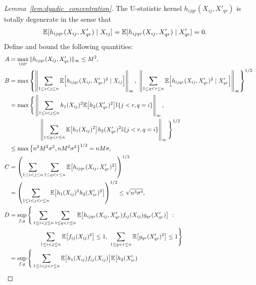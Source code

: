 \begin{proof}[Lemma~\ref{lem:dyadic_concentration}]
  The U-statistic kernel $h_{ijqr}(X_{ij}, X'_{qr})$
  is totally degenerate in the sense that
  \begin{align*}
    \mathbb{E}[h_{ijqr}(X_{ij}, X'_{qr}) \mid X_{ij}]
    &=
    \mathbb{E}[h_{ijqr}(X_{ij}, X'_{qr}) \mid X'_{qr}]
    = 0.
  \end{align*}
  Define and bound the following quantities:
  \begingroup
  \allowdisplaybreaks
  \begin{align*}
    A
    &=
    \max_{ijqr}
    \|h_{ijqr}(X_{ij}, X'_{qr})\|_\infty
    \leq M^2, \\
    B
    &=
    \max
    \left\{
    \left\|
    \sum_{1 \leq i < j \leq n}
    \E\Big[
    h_{ijqr}(X_{ij}, X'_{qr})^2
    \mid X_{ij}
    \Big]
    \right\|_\infty, \
    \left\|
    \sum_{1 \leq q < r \leq n}
    \E\Big[
    h_{ijqr}(X_{ij}, X'_{qr})^2
    \mid X'_{qr}
    \Big]
    \right\|_\infty
    \right\}^{1/2} \\
    &=
    \max
    \Bigg\{
    \left\|
    \sum_{1 \leq i < j \leq n}
    h_1(X_{ij})^2
    \E\big[
      h_2(X_{qr}')^2
      \big]
    \I\{j<r, q=i\}
    \right\|_\infty, \\
    &\qquad\qquad\quad
    \left\|
    \sum_{1 \leq q < r \leq n}
    \E\big[
      h_1(X_{ij})^2
      \big]
    h_2(X_{qr}')^2
    \I\{j<r, q=i\}
    \right\|_\infty
    \Bigg\}^{1/2} \\
    &\leq
    \max
    \left\{
    n^2 M^2 \sigma^2,
    n M^2 \sigma^2
    \right\}^{1/2}
    =
    n M \sigma, \\
    C
    &=
    \left(
      \sum_{1 \leq i < j \leq n}
      \sum_{1 \leq q < r \leq n}
      \E\big[
      h_{ijqr}(X_{ij}, X'_{qr})^2
      \big]
    \right)^{1/2} \\
    &=
    \left(
      \sum_{1 \leq i < j < r \leq n}
      \E\big[
        h_1(X_{ij})^2
        h_2(X_{ir}')^2
        \big]
    \right)^{1/2}
    \leq
    \sqrt{n^3 \sigma^4}, \\
    D
    &=
    \sup_{f,g} \Bigg\{
    \sum_{1 \leq i < j \leq n}
    \sum_{1 \leq q < r \leq n}
    \E\big[
    h_{ijqr}(X_{ij}, X'_{qr})
    f_{ij}(X_{ij})
    g_{qr}(X'_{qr})
    \big]
    \ : \\
    &\qquad\qquad\quad
    \sum_{1 \leq i < j \leq n}
    \E\big[f_{ij}(X_{ij})^2\big]
    \leq 1, \
    \sum_{1 \leq q < r \leq n}
    \E\big[g_{qr}(X'_{qr})^2\big]
    \leq 1
    \Bigg\} \\
    &=
    \sup_{f,g} \Bigg\{
    \sum_{1 \leq i < j < r \leq n}
    \E\big[
      h_1(X_{ij})
      f_{ij}(X_{ij})
      \big]
    \E\big[
    h_2(X'_{ir})

\end{align*}
\end{proof}
